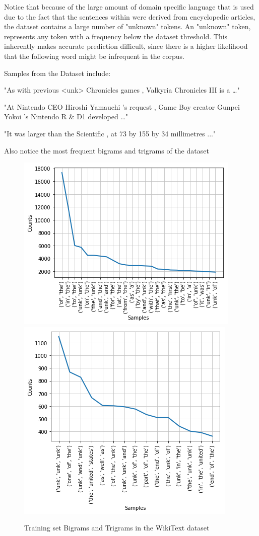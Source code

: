 \documentclass[a4paper]{article}
\begin{document}
Notice that because of the large amount of domain specific language that is used
due to the fact that the sentences within were derived from encyclopedic
articles, the dataset contains a large number of "unknown" tokens. An "unknown"
token, represents any token with a frequency below the dataset threshold. This
inherently makes accurate prediction difficult, since there is a higher
likelihood that the following word might be infrequent in the corpus.

Samples from the Dataset include:

"As with previous <unk> Chronicles games , Valkyria Chronicles III is a …"

"At Nintendo CEO Hiroshi Yamauchi 's request , Game Boy creator Gunpei Yokoi 's Nintendo R \& D1 developed …"

"It was larger than the Scientific , at 73 by 155 by 34 millimetres ..."

Also notice the most frequent bigrams and trigrams of the dataset

\begin{figure}[!ht]
\includegraphics[width=0.8\columnwidth]{sr-eda-wikitext-bigrams}
\includegraphics[width=0.8\columnwidth]{sr-eda-wikitext-trigrams}
\centering
\caption{Training set Bigrams and Trigrams in the WikiText dataset}
\end{figure}
\end{document}
